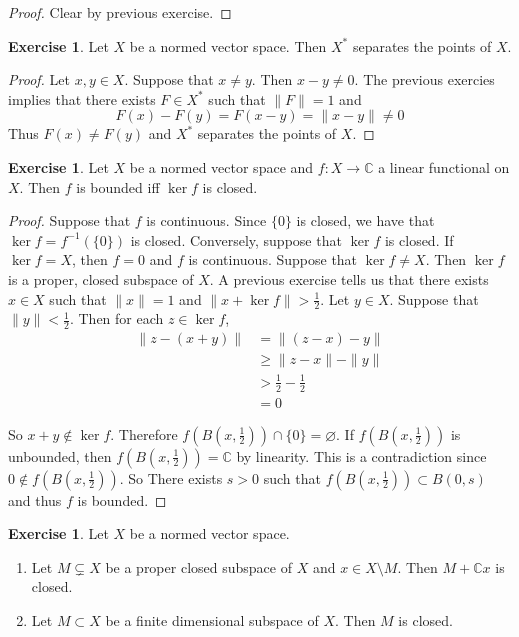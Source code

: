 \documentclass[12pt]{amsart}
\theoremstyle{definition}
\newtheorem{ex}[definition]{Exercise}
\newcommand{\C}{\mathbb{C}}
\DeclareMathOperator*{\0}{\mbf{0}}
\DeclareMathOperator*{\1}{\mbf{1}}
\newcommand{\lex}[1]{\label{ex:#1}}
\begin{document}
	\begin{proof}
	Clear by previous exercise.
\end{proof}		
		
	\begin{ex} \lex{55020}
		Let $X$ be a normed vector space. Then $X^*$ separates the points of $X$. 
	\end{ex}
	
	\begin{proof}
		Let $x, y \in X$. Suppose that $x \neq y$. Then $x-y \neq 0$. The previous exercies implies that there exists $F \in X^*$ such that $\|F \|= 1$ and $$F(x) - F(y) = F(x-y) = \|x-y \|\neq 0$$ Thus $F(x) \neq F(y)$ and $X^*$ separates the points of $X$.
	\end{proof}
	
	
	\begin{ex} \lex{55021}
		Let $X$ be a normed vector space and $f:X \rightarrow \C$ a linear functional on $X$. Then $f$ is bounded iff $\ker f$ is closed. 
	\end{ex}
	
	\begin{proof}
		Suppose that $f$ is continuous. Since $\{0\}$ is closed, we have that $\ker f = f^{-1}(\{0\})$ is closed. Conversely, suppose that $\ker f$ is closed. If $\ker f = X$, then $f =0$ and $f$ is continuous. Suppose that $\ker f \neq X$. Then $\ker f$ is a proper, closed subspace of $X$. A previous exercise tells us that there exists $x \in X$ such that $\|x \|= 1$ and $\|x + \ker f \|> \frac{1}{2}$. Let $y \in X$. Suppose that $\|y \|< \frac{1}{2}$. Then for each $z \in \ker f$, 
		\begin{align*}
			\|z -  (x+y)\|
			& = \|(z-x) -y \|\\
			& \geq \|z-x \|- \|y \|\\
			& > \frac{1}{2} - \frac{1}{2} \\
			&=0
		\end{align*}
		
		So $x+y \not \in \ker f$. Therefore $f(B(x,\frac{1}{2})) \cap \{0\} = \varnothing$. If $f(B(x,\frac{1}{2})) $ is unbounded, then $f(B(x,\frac{1}{2})) = \C$ by linearity. This is a contradiction since $0 \not \in f(B(x,\frac{1}{2}))$. So There exists $s > 0$ such that $f(B(x,\frac{1}{2})) \subset B(0,s)$ and thus $f$ is bounded. 
	\end{proof}
	
	\begin{ex} \lex{55022}
		Let $X$ be a normed vector space. 
		\begin{enumerate}
			\item Let $M \subsetneq X$ be a proper closed subspace of $X$ and $x \in X \setminus M$. Then $M + \C x$ is closed.
			\item Let $M \subset X$ be a finite dimensional subspace of $X$. Then $M$ is closed.
		\end{enumerate}
	\end{ex}
	
\end{document}
